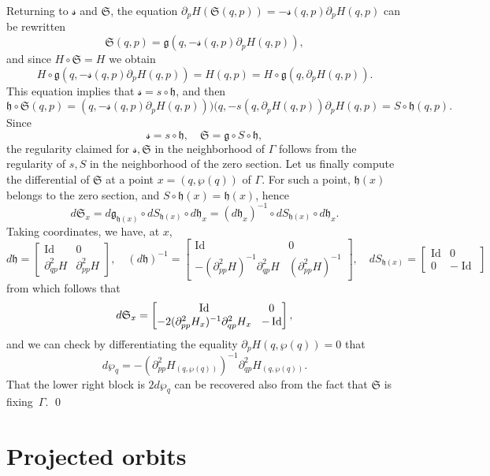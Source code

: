 \documentclass[JEP,XML,SOM,Unicode,published]{cedram}
\DeclareMathOperator{\Id}{Id}
\newcommand{\gS}{\ensuremath{\mathfrak{S}}}
\newcommand{\ms}{\ensuremath{\mathscr{s}}}
\theoremstyle{plain}
\theoremstyle{definition}
\begin{document}
Returning to $\ms$ and $\gS$, the equation
$
\partial_pH(\gS(q,p))= -\ms(q,p)\partial_pH(q,p)
$
can be rewritten
\[
\gS(q,p)=\mathfrak{g} (q,-\ms(q,p) \partial_p H(q,p)),
\]
and since $H\circ \gS=H$ we obtain
\[
H\circ \mathfrak{g} (q, -\ms(q,p) \partial_p H(q,p))
=H(q,p)=H\circ \mathfrak{g} (q, \partial_pH(q,p)).
\]
This equation implies that $\ms=s\circ \mathfrak{h}$, and then
\[
\mathfrak{h}\circ \gS(q,p)= (q, -\ms(q,p)\partial_pH(q,p)))
(q, -s(q,\partial_pH(q,p))\partial_pH(q,p)= S\circ \mathfrak{h}(q,p).
\]
Since
\[
\ms=s \circ \mathfrak{h},\quad \gS=\mathfrak{g}\circ S\circ \mathfrak{h},
\]
the regularity claimed for $\ms,\gS$ in the neighborhood of $\Gamma$ follows from the regularity of $s,S$ in the neighborhood of the zero section.
Let us finally compute the differential of $\gS$ at a point $x=(q, \wp(q))$ of $\Gamma$. For such a point, $\mathfrak{h}(x)$
belongs to the zero section, and
$S\circ \mathfrak{h}(x)=\mathfrak{h}(x)$, hence
\[
d\gS_x
=d\mathfrak{g}_{\mathfrak{h}(x)}\circ dS_{\mathfrak{h}(x)}\circ d\mathfrak{h}_x
=(d\mathfrak{h}_x )^{-1}\circ dS_{\mathfrak{h}(x)}\circ d\mathfrak{h}_x.
\]
Taking coordinates, we have, at $x$,
\[
d\mathfrak{h}=
\begin{bmatrix}
\Id&0\\ \partial^2_{qp}H &\partial^2_{pp}H
\end{bmatrix}, \quad
(d\mathfrak{h})^{-1}=
\begin{bmatrix}
\Id&0\\ -(\partial^2_{pp}H)^{-1} \partial^2_{qp}H &(\partial^2_{pp}H)^{-1}
\end{bmatrix}, \quad
dS_{\mathfrak{h}(x)}=
\begin{bmatrix}
\Id&0\\0&-\Id
\end{bmatrix}
\]
from which follows that
\[\arraycolsep4.5pt
d\gS_x=\begin{bmatrix}
\Id&0\\ -2(\partial^2_{pp}H_x)^{-1} \partial^2_{qp}H_x &-\Id
\end{bmatrix},
\]
and we can check by differentiating the equality
$
\partial_pH(q, \wp (q))=0
$
that
\[
d\wp_q=-
(\partial^2_{pp}H_{(q, \wp(q))})^{-1}
\partial^2_{qp}H_{(q, \wp(q))}.
\]
That the lower right block is $2d\wp_q$ can be recovered also from the fact that $\gS$ is fixing~$\Gamma$.
\qed

\section{Projected orbits}\label{sec-proj}
\end{document}

